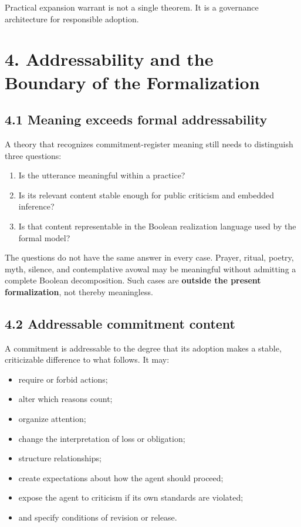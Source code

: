 \documentclass[
  11pt,
]{article}
\providecommand{\tightlist}{%
  \setlength{\itemsep}{0pt}\setlength{\parskip}{0pt}}
\begin{document}
Practical expansion warrant is not a single theorem. It is a governance
architecture for responsible adoption.

\section{4. Addressability and the Boundary of the
Formalization}\label{addressability-and-the-boundary-of-the-formalization}

\subsection{4.1 Meaning exceeds formal
addressability}\label{meaning-exceeds-formal-addressability}

A theory that recognizes commitment-register meaning still needs to
distinguish three questions:

\begin{enumerate}
\def\labelenumi{\arabic{enumi}.}
\tightlist
\item
  Is the utterance meaningful within a practice?
\item
  Is its relevant content stable enough for public criticism and
  embedded inference?
\item
  Is that content representable in the Boolean realization language used
  by the formal model?
\end{enumerate}

The questions do not have the same answer in every case. Prayer, ritual,
poetry, myth, silence, and contemplative avowal may be meaningful
without admitting a complete Boolean decomposition. Such cases are
\textbf{outside the present formalization}, not thereby meaningless.

\subsection{4.2 Addressable commitment
content}\label{addressable-commitment-content}

A commitment is addressable to the degree that its adoption makes a
stable, criticizable difference to what follows. It may:

\begin{itemize}
\tightlist
\item
  require or forbid actions;
\item
  alter which reasons count;
\item
  organize attention;
\item
  change the interpretation of loss or obligation;
\item
  structure relationships;
\item
  create expectations about how the agent should proceed;
\item
  expose the agent to criticism if its own standards are violated;
\item
  and specify conditions of revision or release.
\end{itemize}
\end{document}
